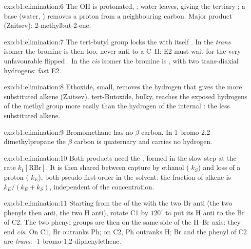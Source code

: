\begin{solution}{exo:b1:elimination:6}
The OH is protonated, ; water leaves, giving the tertiary
 ; a base (water, ) removes a
proton from a neighbouring carbon. Major product (Zaitsev):
2-methylbut-2-ene.
\end{solution}

\begin{solution}{exo:b1:elimination:7}
The tert-butyl group locks the  with itself . In the
\textit{trans} isomer the bromine is then  too, never anti to a
C--H: E2 must wait for the very unfavourable flipped . In the
\textit{cis} isomer the bromine is , with two trans-diaxial
hydrogens: fast E2.
\end{solution}

\begin{solution}{exo:b1:elimination:8}
Ethoxide, small, removes the hydrogen that gives the more substituted
alkene (Zaitsev). tert-Butoxide, bulky, reaches the exposed hydrogens of
the methyl group more easily than the hydrogen of the internal
: the less substituted alkene.
\end{solution}

\begin{solution}{exo:b1:elimination:9}
Bromomethane has no $\beta$ carbon. In 1-bromo-2,2-dimethylpropane the
$\beta$ carbon is quaternary and carries no hydrogen.
\end{solution}

\begin{solution}{exo:b1:elimination:10}
Both products need the , formed in the slow step at the rate
$k_1[\mathrm{RBr}]$. It is then shared between capture by ethanol ( $k_S$) and loss of a proton ( $k_E$), both
pseudo-first-order in the solvent: the fraction of alkene is
$k_E/(k_E + k_S)$, independent of the  concentration.
\end{solution}

\begin{solution}{exo:b1:elimination:11}
Starting from the  of the  with the two Br anti
(the two phenyls then anti, the two H anti), rotate C1 by $120^\circ$ to
put its H anti to the Br of C2. The two phenyl groups are then on the
same side of the H--Br axis: they end \textit{cis}. On C1, Br outranks
Ph; on C2, Ph outranks H; Br and the phenyl of C2 are \textit{trans}:
-1-bromo-1,2-diphenylethene.
\end{solution}

